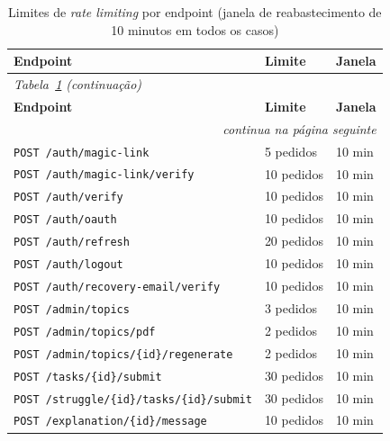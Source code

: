 \begin{longtable}{lll}
\caption{Limites de \textit{rate limiting} por endpoint (janela de reabastecimento de 10 minutos em todos os casos)} \label{tab:rate-limits-endpoint} \\
\hline
\textbf{Endpoint} & \textbf{Limite} & \textbf{Janela} \\
\hline
\endfirsthead
\multicolumn{3}{l}{\small\textit{Tabela~\ref{tab:rate-limits-endpoint} (continuação)}} \\
\hline
\textbf{Endpoint} & \textbf{Limite} & \textbf{Janela} \\
\hline
\endhead
\hline
\multicolumn{3}{r}{\small\textit{continua na página seguinte}} \\
\endfoot
\hline
\endlastfoot
\texttt{POST /auth/magic-link}                              & 5 pedidos  & 10 min \\
\texttt{POST /auth/magic-link/verify}                        & 10 pedidos & 10 min \\
\texttt{POST /auth/verify}                                   & 10 pedidos & 10 min \\
\texttt{POST /auth/oauth}                                    & 10 pedidos & 10 min \\
\texttt{POST /auth/refresh}                                  & 20 pedidos & 10 min \\
\texttt{POST /auth/logout}                                   & 10 pedidos & 10 min \\
\texttt{POST /auth/recovery-email/verify}                    & 10 pedidos & 10 min \\
\texttt{POST /admin/topics}                                  & 3 pedidos  & 10 min \\
\texttt{POST /admin/topics/pdf}                               & 2 pedidos  & 10 min \\
\texttt{POST /admin/topics/\{id\}/regenerate}                 & 2 pedidos  & 10 min \\
\texttt{POST /tasks/\{id\}/submit}                            & 30 pedidos & 10 min \\
\texttt{POST /struggle/\{id\}/tasks/\{id\}/submit}            & 30 pedidos & 10 min \\
\texttt{POST /explanation/\{id\}/message}                     & 10 pedidos & 10 min \\
\end{longtable}

